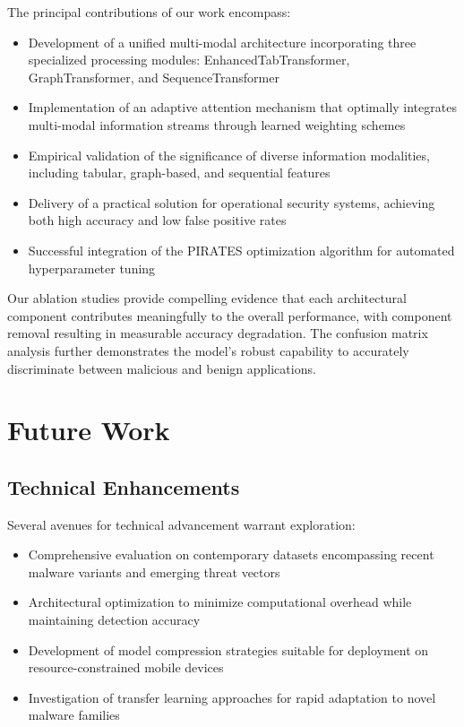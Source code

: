 \documentclass[a4paper,11pt]{article}
\begin{document}
The principal contributions of our work encompass:
\begin{itemize}
    \item Development of a unified multi-modal architecture incorporating three specialized processing modules: EnhancedTabTransformer, GraphTransformer, and SequenceTransformer
    \item Implementation of an adaptive attention mechanism that optimally integrates multi-modal information streams through learned weighting schemes
    \item Empirical validation of the significance of diverse information modalities, including tabular, graph-based, and sequential features
    \item Delivery of a practical solution for operational security systems, achieving both high accuracy and low false positive rates
    \item Successful integration of the PIRATES optimization algorithm for automated hyperparameter tuning
\end{itemize}

Our ablation studies provide compelling evidence that each architectural component contributes meaningfully to the overall performance, with component removal resulting in measurable accuracy degradation. The confusion matrix analysis further demonstrates the model's robust capability to accurately discriminate between malicious and benign applications.

\section{Future Work}
\subsection{Technical Enhancements}
Several avenues for technical advancement warrant exploration:
\begin{itemize}
    \item Comprehensive evaluation on contemporary datasets encompassing recent malware variants and emerging threat vectors
    \item Architectural optimization to minimize computational overhead while maintaining detection accuracy
    \item Development of model compression strategies suitable for deployment on resource-constrained mobile devices
    \item Investigation of transfer learning approaches for rapid adaptation to novel malware families
\end{itemize}
\end{document}
